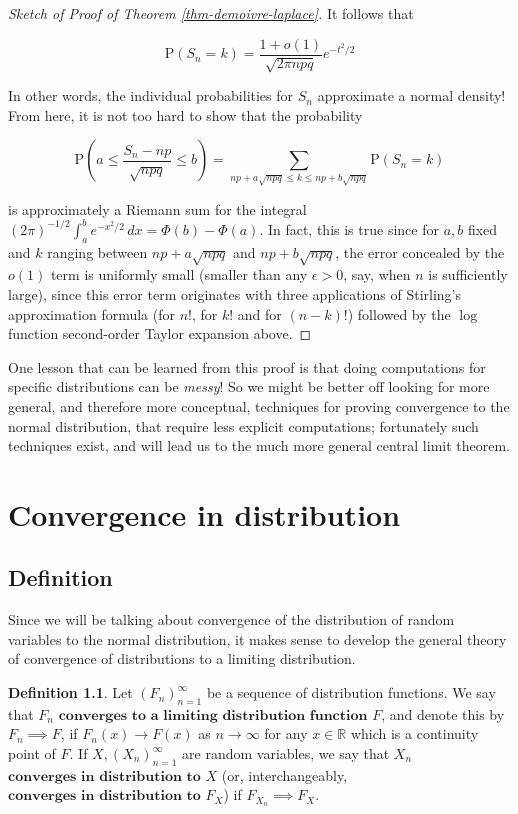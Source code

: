 \documentclass[11pt]{report}
\newcommand{\R}{\mathbb{R}}
\theoremstyle{plain}
\theoremstyle{definition}
\newtheorem{defn}[thm]{Definition}
\begin{document}
\begin{proof}[Sketch of Proof of Theorem \ref{thm-demoivre-laplace}]
It follows that

\[
\mathrm{P}(S_n = k) = \frac{1+o(1)}{\sqrt{2\pi n p q}} e^{-t^2/2}
\]

In other words, the individual probabilities for
$S_n$ approximate a normal density! From here, it is
not too hard to show that the probability

\[
\mathrm{P}\left(a\le \frac{S_n - np}{\sqrt{npq}} \le b\right) = \sum_{np+a\sqrt{npq}\le k\le np+b\sqrt{npq}} \mathrm{P}(S_n=k)
\]

is approximately a Riemann sum for the integral
$(2\pi)^{-1/2}\int_a^b e^{-x^2/2}\,dx =
\Phi(b)-\Phi(a)$.
In fact, this is true since for $a,b$ fixed and $k$
ranging between $np+a\sqrt{npq}$ and $np+b\sqrt{npq}$,
the error concealed by the $o(1)$ term is uniformly
small (smaller than any $\epsilon>0$, say, when $n$
is sufficiently large), since this error term
originates with three applications of Stirling's
approximation formula (for $n!$, for $k!$ and for
$(n-k)!$) followed by the $\log$ function
second-order Taylor expansion above.
\end{proof}

One lesson that can be learned from this proof is
that doing computations for specific distributions can
be \emph{messy}! So we might be better off looking for more
general, and therefore more conceptual, techniques for
proving convergence to the normal distribution, that
require less explicit computations; fortunately such
techniques exist, and will lead us to the much more
general central limit theorem.

\chapter{Convergence in distribution}

\section{Definition}
Since we will be talking about convergence of the
distribution of random variables to the normal
distribution, it makes sense to develop the general
theory of convergence of distributions to a limiting
distribution.

\begin{defn}
Let $(F_n)_{n=1}^\infty$ be a sequence of
distribution functions. We say that $F_n$
$\textbf{converges to a limiting distribution
function}$
$F$, and denote this by $F_n \implies F$, if
$F_n(x)\to F(x)$ as $n\to\infty$ for any $x\in\R$
which is a continuity point of $F$. If
$X, (X_n)_{n=1}^\infty$ are random variables, we say
that $X_n$ $\textbf{converges in distribution to } X$
(or, interchangeably,
$\textbf{converges in distribution to } F_X$) if
$F_{X_n}\implies F_X$.
\end{defn}
\end{document}
